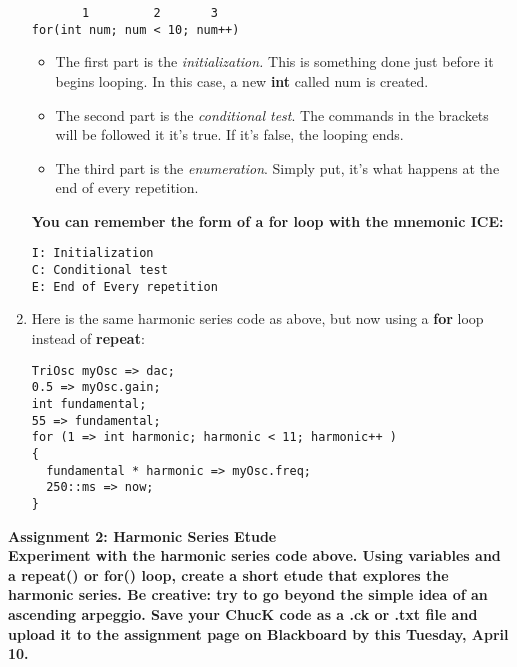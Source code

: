 \documentclass{article}
\begin{document}
\begin{enumerate}
\begin{lstlisting}
       1         2       3
for(int num; num < 10; num++)
\end{lstlisting}


\begin{itemize}
\item The first part is the \textsl{initialization.} This is something
done just before it begins looping. In this case, a new \textbf{int} called
num is created.
\item The second part is the \textsl{conditional test}. The commands in the
brackets will be followed it it's true. If it's false, the looping ends.
\item The third part is the \textsl{enumeration}. Simply put, it's what
happens at the end of every repetition.
\end{itemize}

\textbf{You can remember the form of a for loop with the mnemonic ICE:}
\begin{lstlisting}
I: Initialization
C: Conditional test
E: End of Every repetition
\end{lstlisting}

\item Here is the same harmonic series code as above, but now using
a \textbf{for} loop instead of \textbf{repeat}:

\begin{lstlisting}
TriOsc myOsc => dac;
0.5 => myOsc.gain;
int fundamental;
55 => fundamental;
for (1 => int harmonic; harmonic < 11; harmonic++ )
{
  fundamental * harmonic => myOsc.freq;
  250::ms => now;
}
\end{lstlisting}
\end{enumerate}

\textbf{Assignment 2: Harmonic Series Etude}\vspace{2mm}
\\
\textbf{Experiment with the harmonic series code above. Using variables
and a repeat() or for() loop, create a short etude that explores the
harmonic series. Be creative: try to go beyond the simple idea of an
ascending arpeggio. Save your ChucK code as a .ck or .txt file and
upload it to the assignment page on Blackboard by this Tuesday, April 10.}
\end{document}
